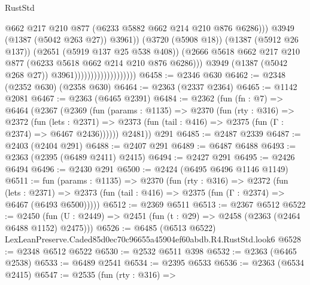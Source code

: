 \begin{lexlean}{RustStd}
\begin{coremodule}
                                                    @662
                                                    @217
                                                    @210
                                                    @877
                                                    (@6233 @5882 @662 @214 @210 @876 @6286)))
                                                @3949
                                                (@1387 (@5042 @263 @27))
                                                @3961))
                                            (@3720 (@5908 @18))
                                            (@1387 (@5912 @26 @137))
                                            (@2651 (@5919 @137 @25 @538 @408))
                                            (@2666
                                              @5618
                                              @662
                                              @217
                                              @210
                                              @877
                                              (@6233 @5618 @662 @214 @210 @876 @6286)))
                                          @3949
                                          (@1387 (@5042 @268 @27))
                                          @3961)))))))))))))))))))
@6458 := @2346 @630
@6462 := @2348 (@2352 @630) (@2358 @630)
@6464 := @2363 (@2337 @2364)
@6465 := @1142 @2081
@6467 := @2363 (@6465 @2391)
@6484 := @2362
    (fun (fn : @7) =>
    @6464
      (@2367
        (@2369
          (fun (params : @1135) =>
          @2370
            (fun (rty : @316) =>
            @2372
              (fun (lets : @2371) =>
              @2373 (fun (tail : @416) => @2375 (fun (Γ : @2374) => @6467 @2436))))))
        @2481))
    @291
@6485 := @2487 @2339
@6487 := @2403 (@2404 @291)
@6488 := @2407 @291
@6489 := @6487 @6488
@6493 := @2363 (@2395 (@6489 @2411) @2415)
@6494 := @2427 @291
@6495 := @2426 @6494
@6496 := @2430 @291
@6500 := @2424 (@6495 @6496 @1146 @1149)
@6511 := fun (params : @1135) =>
  @2370
    (fun (rty : @316) =>
    @2372
      (fun (lets : @2371) =>
      @2373 (fun (tail : @416) => @2375 (fun (Γ : @2374) => @6467 (@6493 @6500)))))
@6512 := @2369 @6511
@6513 := @2367 @6512
@6522 := @2450 (fun (U : @2449) => @2451 (fun (t : @29) => @2458 (@2363 (@2464 @6488 @1152) @2475)))
@6526 := @6485 (@6513 @6522) LexLeanPreserve.Caded85d0ec70c96655a45904ef60abdb.R4.RustStd.look6
@6528 := @2348 @6512 @6522
@6530 := @2532 @6511 @398
@6532 := @2363 (@6465 @2538)
@6533 := @6489 @2541
@6534 := @2395 @6533
@6536 := @2363 (@6534 @2415)
@6547 := @2535
    (fun (rty : @316) =>

\end{coremodule}
\end{lexlean}
